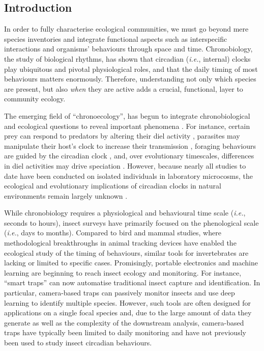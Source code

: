 \documentclass[12pt]{article}
\begin{document}
\begin{linenumbers}	
		
		\section*{Introduction}
		
		In order to fully characterise ecological communities, we must go beyond mere species inventories and integrate functional aspects such as interspecific interactions and organisms’ behaviours through space and time\cite{bro-jorgensen_linking_2019, cordero-rivera_behavioral_2017}. %
		Chronobiology, the study of biological rhythms, has shown that circadian (\emph{i.e.}, internal) clocks play ubiquitous and pivotal physiological roles, and that the daily timing of most behaviours matters enormously\cite{patke_molecular_2020}. Therefore, understanding not only which species are present, but also \emph{when} they are active adds a crucial, functional, layer to community ecology.
		
		The emerging field of “chronoecology”, has begun to integrate chronobiological and ecological questions to reveal important phenomena \cite{halle_chronoecology_2000,helm_two_2017}. For instance, certain prey can respond to predators by altering their diel activity \cite{van_der_veen_flexible_2017}, parasites may manipulate their host’s clock to increase their transmission \cite{westwood_evolutionary_2019}, foraging behaviours are guided by the circadian clock \cite{jain_time-restricted_2018}, and, over evolutionary timescales, differences in diel activities may drive speciation \cite{taylor_role_2017}. However, because nearly all studies to date have been conducted on isolated individuals in laboratory microcosms, the ecological and evolutionary implications of circadian clocks in natural environments remain largely unknown \cite{schwartz_wild_2017}.
		
		While chronobiology requires a physiological and behavioural time scale (\emph{i.e.}, seconds to hours), insect surveys have primarily focused on the phenological scale (\emph{i.e.}, days to months). Compared to bird and mammal studies, where methodological breakthroughs in animal tracking devices have enabled the ecological study of the timing of behaviours, similar tools for invertebrates are lacking\cite{dominoni_methods_2017} or limited to specific cases\cite{brydegaard_daily_2016,goldshtein_long-term_2021,nunes-silva_applications_2019}. Promisingly, portable electronics and machine learning are beginning to reach insect ecology and monitoring\cite{hoye_deep_2021}. For instance, “smart traps” can now automatise traditional insect capture and identification\cite{cardim_ferreira_lima_automatic_2020}. In particular, camera-based traps can passively monitor insects and use deep learning to identify multiple species. However, such tools are often designed for applications on a single focal species and, due to the large amount of data they generate as well as the complexity of the downstream analysis, camera-based traps have typically been limited to daily monitoring and have not previously been used to study insect circadian behaviours.
		

\end{linenumbers}
\end{document}
